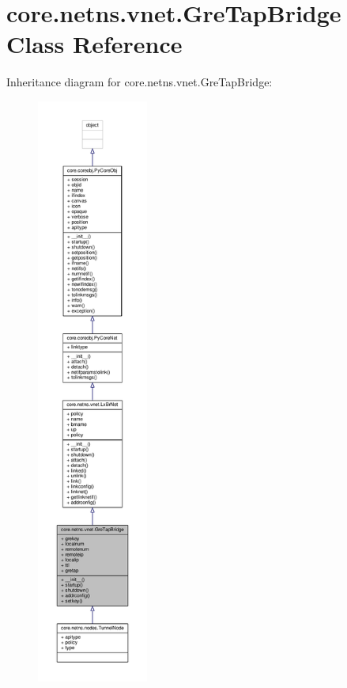 \hypertarget{classcore_1_1netns_1_1vnet_1_1_gre_tap_bridge}{\section{core.\+netns.\+vnet.\+Gre\+Tap\+Bridge Class Reference}
\label{classcore_1_1netns_1_1vnet_1_1_gre_tap_bridge}
}


Inheritance diagram for core.\+netns.\+vnet.\+Gre\+Tap\+Bridge\+:
\nopagebreak
\begin{figure}[H]
\begin{center}
\leavevmode
\includegraphics[height=550pt]{classcore_1_1netns_1_1vnet_1_1_gre_tap_bridge__inherit__graph}
\end{center}
\end{figure}


